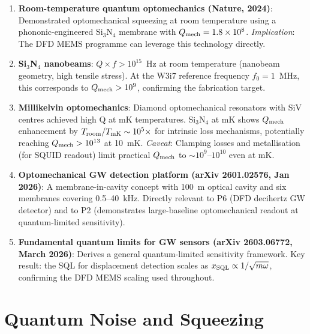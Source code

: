 \documentclass[11pt]{article}
\newcommand{\ee}[1]{\times 10^{#1}}
\newcommand{\Qmech}{Q_{\rm mech}}
\theoremstyle{definition}
\theoremstyle{remark}
\begin{document}
\begin{enumerate}
\item \textbf{Room-temperature quantum optomechanics (Nature, 2024)}:
  Demonstrated optomechanical squeezing at room temperature using a
  phononic-engineered Si$_3$N$_4$ membrane with $\Qmech = 1.8\ee{8}$.
  \emph{Implication}: The DFD MEMS programme can leverage this
  technology directly.

\item \textbf{Si$_3$N$_4$ nanobeams}: $Q \times f > 10^{15}$~Hz
  at room temperature (nanobeam geometry, high tensile stress).
  At the W3i7 reference frequency $f_0 = 1$~MHz, this corresponds
  to $\Qmech > 10^9$, confirming the fabrication target.

\item \textbf{Millikelvin optomechanics}: Diamond optomechanical
  resonators with SiV centres achieved high Q at mK temperatures.
  Si$_3$N$_4$ at mK shows $\Qmech$ enhancement by
  $T_{\rm room}/T_{\rm mK} \sim 10^5\times$ for intrinsic loss
  mechanisms, potentially reaching $\Qmech > 10^{13}$ at 10~mK.
  \emph{Caveat}: Clamping losses and metallisation (for SQUID
  readout) limit practical $\Qmech$ to $\sim 10^{9}$--$10^{10}$
  even at mK.

\item \textbf{Optomechanical GW detection platform (arXiv 2601.02576,
  Jan 2026)}: A membrane-in-cavity concept with 100~m optical
  cavity and six membranes covering 0.5--40~kHz. Directly relevant
  to P6 (DFD decihertz GW detector) and to P2 (demonstrates
  large-baseline optomechanical readout at quantum-limited
  sensitivity).

\item \textbf{Fundamental quantum limits for GW sensors
  (arXiv 2603.06772, March 2026)}: Derives a general quantum-limited
  sensitivity framework. Key result: the SQL for displacement
  detection scales as $x_{\rm SQL} \propto 1/\sqrt{m\omega}$,
  confirming the DFD MEMS scaling used throughout.
\end{enumerate}

\section{Quantum Noise and Squeezing}
\label{sec:squeezing_lit}
\end{document}
